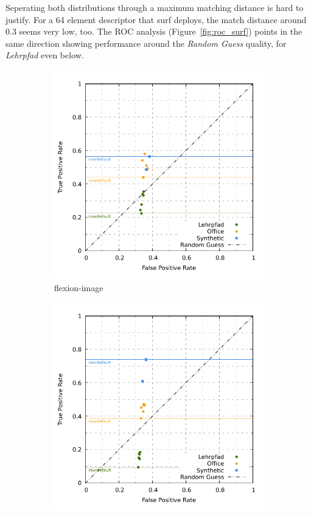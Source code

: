 Seperating both distributions through a maximum matching distance is hard to justify.
For a 64 element descriptor that \acrshort{surf} deploys, the match distance around \num{0.3} seems very low, too.
The \acrshort{ROC} analysis (Figure~\ref{fig:roc_surf}) points in the same direction showing performance around the \emph{Random Guess} quality, for \emph{Lehrpfad} even below.
\begin{figure}[ht]
\begin{subfigure}[t]{0.45\linewidth}
    \includegraphics[width=\linewidth]{chapter06/results/SURF/flexion/roc.pdf}%
    \caption{\gls{flexion-image}}
\end{subfigure}\quad
\begin{subfigure}[t]{0.45\linewidth}
    \includegraphics[width=\linewidth]{chapter06/results/SURF/bearing/roc.pdf}

\end{subfigure}
\end{figure}
